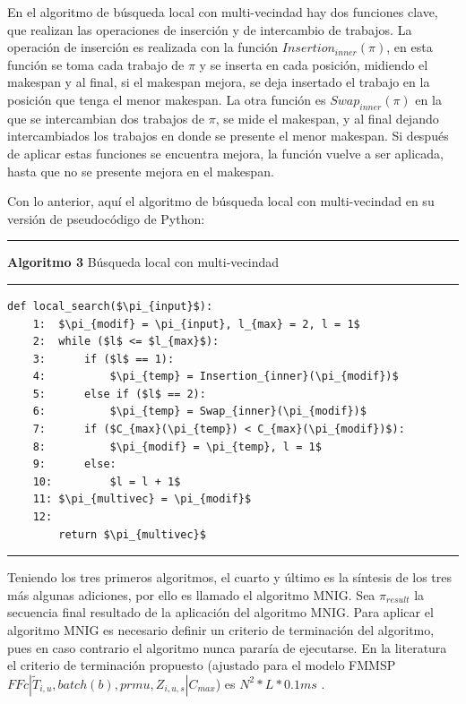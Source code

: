 \documentclass{article}
\def\notac_modelo{$FFc | \tilde{T}_{i, u}, batch(b), prmu, Z_{i, u, s} | C_{max}$}
\begin{document}
\vspace{\baselineskip}
En el algoritmo de búsqueda local con multi-vecindad hay dos funciones clave, que realizan las operaciones de inserción y de intercambio de trabajos. La operación de inserción es realizada con la función $Insertion_{inner}(\pi)$, en esta función se toma cada trabajo de $\pi$ y se inserta en cada posición, midiendo el makespan y al final, si el makespan mejora, se deja insertado el trabajo en la posición que tenga el menor makespan. La otra función es $Swap_{inner}(\pi)$ en la que se intercambian dos trabajos de $\pi$, se mide el makespan, y al final dejando intercambiados los trabajos en donde se presente el menor makespan. Si después de aplicar estas funciones se encuentra mejora, la función vuelve a ser aplicada, hasta que no se presente mejora en el makespan. \autocite{algMNIG}

\vspace{\baselineskip}
Con lo anterior, aquí el algoritmo de búsqueda local con multi-vecindad en su versión de pseudocódigo de Python:

\noindent\noindent
\rule{\linewidth}{0.4pt}

\textbf{Algoritmo 3} Búsqueda local con multi-vecindad

\noindent\noindent
\rule{\linewidth}{0.4pt}

\begin{lstlisting}[mathescape=true]
    def local_search($\pi_{input}$):
    1:  $\pi_{modif} = \pi_{input}, l_{max} = 2, l = 1$
    2:  while ($l$ <= $l_{max}$):
    3:      if ($l$ == 1):
    4:          $\pi_{temp} = Insertion_{inner}(\pi_{modif})$
    5:      else if ($l$ == 2):
    6:          $\pi_{temp} = Swap_{inner}(\pi_{modif})$
    7:      if ($C_{max}(\pi_{temp}) < C_{max}(\pi_{modif})$):
    8:          $\pi_{modif} = \pi_{temp}, l = 1$
    9:      else:
    10:         $l = l + 1$
    11: $\pi_{multivec} = \pi_{modif}$
    12:
        return $\pi_{multivec}$
\end{lstlisting}

\noindent\noindent
\rule{\linewidth}{0.4pt}

\vspace{\baselineskip}
Teniendo los tres primeros algoritmos, el cuarto y último es la síntesis de los tres más algunas adiciones, por ello es llamado el algoritmo MNIG. Sea $\pi_{result}$ la secuencia final resultado de la aplicación del algoritmo MNIG. Para aplicar el algoritmo MNIG es necesario definir un criterio de terminación del algoritmo, pues en caso contrario el algoritmo nunca pararía de ejecutarse. En la literatura el criterio de terminación propuesto (ajustado para el modelo FMMSP \notac_modelo) es $N^2*L*0.1ms$ \autocite{algMNIG}. 
\end{document}
